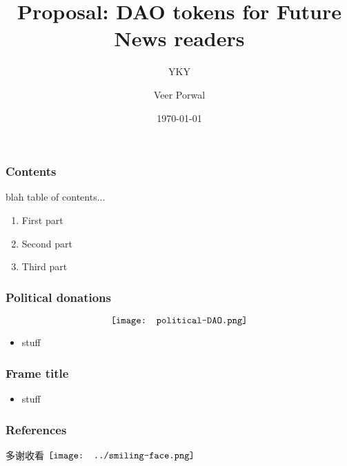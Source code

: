 \documentclass[16pt]{beamer}
\title[Short title]{Proposal: DAO tokens for Future News readers}
\author{YKY \and Veer Porwal}
\date{\today} %
\newcommand{\cc}[2]{#1}
\newcommand{\cc}[2]{#2}
\newcommand{\smiley}{$\vcenter{\hbox{\texttt{[image: ../smiling-face.png]}}}$}
\begin{document}
\addtocounter{page}{-1}
\begin{frame}
\titlepage
\end{frame}

\addtocounter{page}{-1}
\begin{frame}[noframenumbering]
\frametitle{Contents}
\fontsize{10pt}{8}\selectfont
blah table of contents...

\begin{enumerate}[I]
	\item First part
	
	\item Second part
	
	\item Third part
\end{enumerate}
\end{frame}


\begin{frame}
\frametitle{Political donations}
\begin{equation}
\vcenter{\hbox{\texttt{[image: political-DAO.png]}}}
\nonumber
\end{equation}
\begin{itemize}
	\item stuff
\end{itemize}
\end{frame}

\begin{frame}
	\frametitle{Frame title}
	\begin{itemize}
		\item stuff
	\end{itemize}
\end{frame}

\begin{frame}
\frametitle{References}
\cc{多谢收看}{Thanks for watching} \smiley \vspace{1cm}
\printbibliography
\end{frame}
\end{document}
